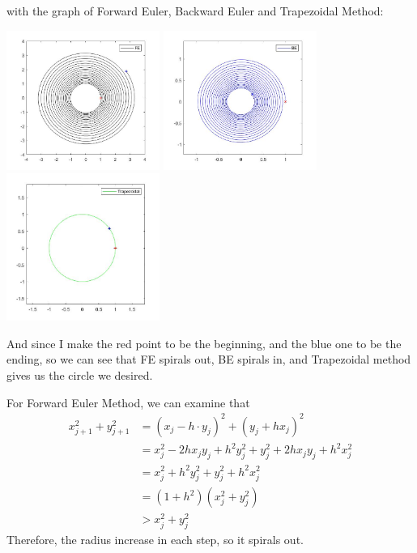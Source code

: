 \documentclass{article}
\begin{document}
\begin{enumerate}
 with the graph of Forward Euler, Backward Euler and  Trapezoidal Method:
  \begin{center}
  \includegraphics[width=5cm]{circle_FE.jpg}  
  \includegraphics[width=5cm]{circle_BE.jpg}  
  \includegraphics[width=5cm]{circle_trap.jpg} 
 \end{center}
 And since I make the red point to be the beginning, and the blue one to be the ending, so we can see that FE spirals out, BE spirals in, and Trapezoidal method gives us the circle we desired.
 
 
 For Forward Euler Method, we can examine that\begin{align*}
 x_{j+1}^2+y_{j+1}^2&=(x_j-h\cdot y_j)^2+ (y_j+hx_j)^2\\
 &=x_j^2-2hx_jy_j+h^2y_j^2+y_j^2+2hx_jy_j+h^2x_j^2\\
 &=x_j^2+h^2y_j^2+y_j^2+h^2x_j^2\\
 &=(1+h^2)(x_j^2+y_j^2)\\
 &> x_j^2+y_j^2
 \end{align*}
 Therefore, the radius increase in each step, so it spirals out.
 

\end{enumerate}
\end{document}
